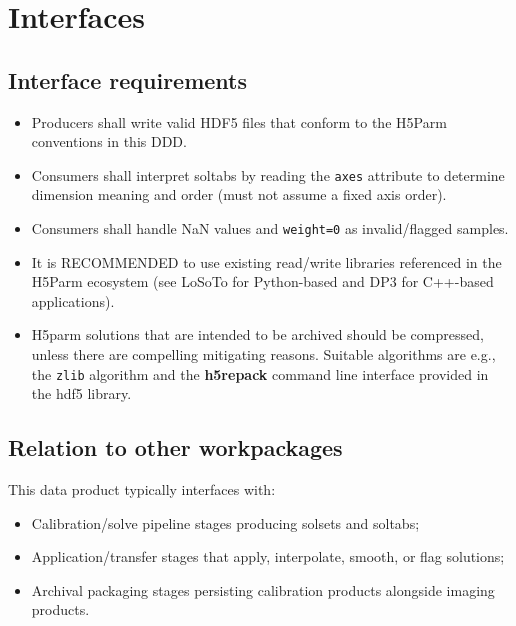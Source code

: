 \documentclass[a4paper,10pt,bibtotoc]{scrartcl}
\begin{document}

\section{Interfaces}
\label{sec:interfaces}

\subsection{Interface requirements}
\begin{itemize}
  \item Producers {shall} write valid HDF5 files that conform to the H5Parm conventions in this DDD.
  \item Consumers {shall} interpret soltabs by reading the \texttt{axes} attribute to determine dimension
        meaning and order (must not assume a fixed axis order). 
  \item Consumers {shall} handle NaN values and \texttt{weight=0} as invalid/flagged samples. 
  \item It is RECOMMENDED to use existing read/write libraries referenced in the H5Parm ecosystem (see LoSoTo for Python-based and DP3 for C++-based applications).
  \item H5parm solutions that are intended to be archived should be compressed, unless there are compelling mitigating reasons. Suitable algorithms are e.g., the \texttt{zlib} algorithm and the \textbf{h5repack} command line interface  provided in the hdf5 library.
\end{itemize}


\subsection{Relation to other workpackages}
This data product typically interfaces with:
\begin{itemize}
  \item Calibration/solve pipeline stages producing solsets and soltabs;
  \item Application/transfer stages that apply, interpolate, smooth, or flag solutions;
  \item Archival packaging stages persisting calibration products alongside imaging products.
\end{itemize}

\end{document}
